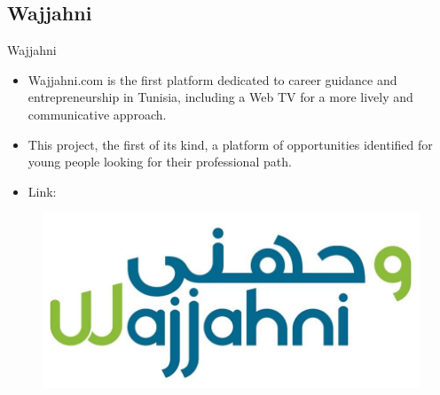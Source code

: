 \subsection{Wajjahni}
\begin{frame}{Wajjahni}
\hspace{-0.5cm}
\begin{minipage}{0.7\linewidth}
 \renewcommand{\raggedright}{\leftskip=0pt \rightskip=0pt plus 0cm}
    \begin{itemize} em
    \item Wajjahni.com is the first platform dedicated to career guidance and entrepreneurship in Tunisia, including a Web TV for a more lively and communicative approach.
    \item This project, the first of its kind, a platform of opportunities identified for young people looking for their professional path.
    \item Link:  \href{http://wajjahni.com/}{}
\end{itemize}
\end{minipage}
\hspace{0.1cm}
\begin{minipage}{0.2\linewidth}
\begin{figure}
    \centering
    \includegraphics[scale=0.15]{figures/Wajjahni.jpg}
\end{figure}
\end{minipage}
\end{frame}

\begin{frame}
\end{frame}

